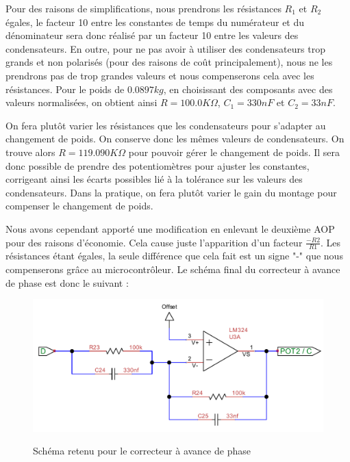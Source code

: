 \documentclass[11pt, french]{article} %
\begin{document}
\vspace{0.5cm}

Pour des raisons de simplifications, nous prendrons les résistances $R_1$ et $R_2$ égales, le facteur 10 entre les constantes de temps du numérateur et du dénominateur sera donc réalisé par un facteur 10 entre les valeurs des condensateurs. En outre, pour ne pas avoir à utiliser des condensateurs trop grands et non polarisés (pour des raisons de coût principalement), nous ne les prendrons pas de trop grandes valeurs et nous compenserons cela avec les résistances. Pour le poids de $0.0897 kg$, en choisissant des composants avec des valeurs normalisées, on obtient ainsi $R=100.0 K\Omega$, $C_1=330 nF$ et $C_2=33 nF$.

\vspace{0.5cm}
On fera plutôt varier les résistances que les condensateurs pour s'adapter au changement de poids. On conserve donc les mêmes valeurs de condensateurs. On trouve alors $R=119.090 K\Omega$ pour pouvoir gérer le changement de poids. Il sera donc possible de prendre des potentiomètres pour ajuster les constantes, corrigeant ainsi les écarts possibles lié à la tolérance sur les valeurs des condensateurs. Dans la pratique, on fera plutôt varier le gain du montage pour compenser le changement de poids. 

\vspace{0.5cm}

Nous avons cependant apporté une modification en enlevant le deuxième AOP pour des raisons d'économie. Cela cause juste l'apparition d'un facteur $\frac{-R2}{R1}$. Les résistances étant égales, la seule différence que cela fait est un signe "-" que nous compenserons grâce au microcontrôleur. Le schéma final du correcteur à avance de phase est donc le suivant :

\begin{figure}[!h]
    \centering
	\includegraphics[scale = 0.8]{SolutionAnalogique/AvPhase.pdf}
	\label{avph_schm}
	\caption{Schéma retenu pour le correcteur à avance de phase}
\end{figure}
\end{document}
